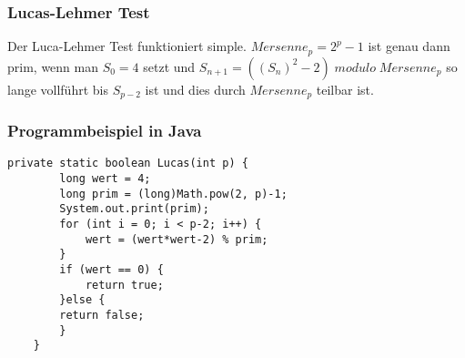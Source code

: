 \subsubsection{Lucas-Lehmer Test}
Der Luca-Lehmer Test funktioniert simple. $Mersenne_p=2^p-1$ ist genau dann prim, wenn man $S_0=4$ setzt und $S_{n+1}=((S_n)^2-2)\;modulo\;Mersenne_p$ so lange vollführt bis $S_{p-2}$ ist und dies durch $Mersenne_p$ teilbar ist.
\subsubsection{Programmbeispiel in Java}
\lstset{language=Java} 
\begin{lstlisting}[frame=single]
private static boolean Lucas(int p) {
		long wert = 4;
		long prim = (long)Math.pow(2, p)-1;
		System.out.print(prim);
		for (int i = 0; i < p-2; i++) {
			wert = (wert*wert-2) % prim;			
		}
		if (wert == 0) {
			return true;			
		}else {
		return false;
		}
	}
\end{lstlisting}